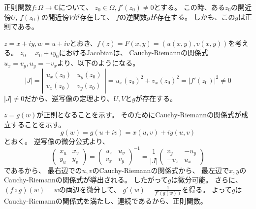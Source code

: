 \documentclass[a4paper]{jarticle}
\begin{document}
    \begin{Them}[p.44, 逆関数定理]
        正則関数$f:\Omega \to \mathbb{C}$について、
        $z_0 \in \Omega, f'(z_0) \neq 0$とする。
        この時、ある$z_0$の開近傍$U$, $f(z_0)$の開近傍$V$が存在して、
        $f$の逆関数$g$が存在する。
        しかも、この$g$は正則である。
    \end{Them}
    \begin{Proof}
        $z=x+iy, w=u+iv$とおき、$f(z)=F(x,y)=(u(x,y), v(x,y))$を考える。
        $z_0=x_0+iy_0$におけるJacobianは、
        Cauchy-Riemannの関係式$u_x=v_y, u_y=-v_x$より、以下のようになる。
        \[
            |J|=
            \left|
            \begin{array}{cc}
                u_x(z_0) & u_y(z_0) \\
                v_x(z_0) & v_y(z_0)
            \end{array}
            \right|
            ={u_x(z_0)}^2+{v_x(z_0)}^2
            =|f'(z_0)|^2
            \neq 0
        \]
        $|J| \neq 0$だから、逆写像の定理より、$U, V$と$g$が存在する。

        $z=g(w)$が正則となることを示す。
        そのためにCauchy-Riemannの関係式が成立することを示す。
        \[ g(w)=g(u+iv)=x(u, v)+iy(u, v) \]
        とおく。
        逆写像の微分公式より、
        \[
            \left(
            \begin{array}{cc}
                x_u & x_v \\
                y_u & y_v
            \end{array}
            \right)
            =
            \left(
            \begin{array}{cc}
                u_x & u_y \\
                v_x & v_y
            \end{array}
            \right)^{-1}
            =
            \frac{1}{|J|}
            \left(
            \begin{array}{cc}
                v_y & -u_y \\
                -v_x & u_x
            \end{array}
            \right)
        \]
        であるから、
        最右辺での$u, v$のCauchy-Riemannの関係式から、
        最左辺で$x,y$のCauchy-Riemannの関係式が導出される。
        したがって$g$は微分可能。
        さらに、$(f \circ g)(w)=w$の両辺を微分して、
        $g'(w)=\frac{1}{f'(g(w))}$を得る。
        よって$g$はCauchy-Riemannの関係式を満たし、連続であるから、正則関数。
        \QED
    \end{Proof}
    
\end{document}
